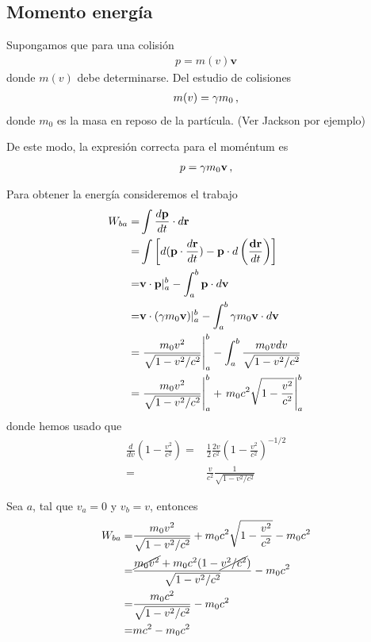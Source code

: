 \begin{frame}
\section{Momento energía}
Supongamos que para una colisión
\begin{align*}
  p=m(v)\mathbf{v}
\end{align*}
donde $m(v)$ debe determinarse. Del estudio de colisiones
\begin{align*}
  m(v)=\gamma m_0\,,
\end{align*}
donde $m_0$ es la masa en reposo de la partícula. (Ver Jackson por ejemplo)

De este modo, la expresión correcta para el moméntum es
\begin{align}
  \label{eq:gmv}
  p=\gamma m_0 \mathbf{v}\,,  
\end{align}


Para obtener la energía consideremos el trabajo
\begin{align*}
  W_{ba}=&\int\frac{d\mathbf{p}}{dt}\cdot d\mathbf{r}\nonumber\\
  =&\int\left[d(\mathbf{p}\cdot\frac{d\mathbf{r}}{dt})-\mathbf{p}\cdot d\left(\frac{\mathbf{dr}}{dt}  \right)\right]\nonumber\\
=&\mathbf{v}\cdot \mathbf{p}|_a^b-\int_a^b\mathbf{p}\cdot d\mathbf{v}\nonumber\\
=&\mathbf{v}\cdot (\gamma m_0\mathbf{v})|_a^b-\int_a^b\gamma m_0\mathbf{v}\cdot d\mathbf{v}\nonumber\\
=&\left.\frac{m_0 v^2}{\sqrt{1-{v^2}/{c^2}}}\right|_a^b-\int_a^b\frac{m_0v dv}{\sqrt{1-v^2/c^2}}\nonumber\\
=&\left.\frac{m_0 v^2}{\sqrt{1-{v^2}/{c^2}}}\right|_a^b+\left.m_0 c^2\sqrt{1-\frac{v^2}{c^2}}\right|_a^b
\end{align*}
donde hemos usado que
\begin{align*}
  \frac{d}{dv}
  \left(
    1-\frac{v^2}{c^2}
  \right)=&\frac{1}{2}\frac{2v}{c^2}
  \left(1-\frac{v^2}{c^2}\right)^{-1/2}\nonumber\\
  =&\frac{v}{c^2}\frac{1}{\sqrt{1-{v^2}/{c^2}}}
\end{align*}

Sea $a$, tal que $v_a=0$ y $v_b=v$, entonces
\begin{align*}
  W_{ba}=&\frac{m_0 v^2}{\sqrt{1-v^2/c^2}}+m_0 c^2\sqrt{1-\frac{v^2}{c^2}}-m_0 c^2\nonumber\\
=&\frac{\cancel{m_0 v^2}+m_0c^2(1-\cancel{v^2/c^2})}{\sqrt{1-v^2/c^2}}-m_0 c^2\nonumber\\
=&\frac{m_0c^2}{\sqrt{1-v^2/c^2}}-m_0 c^2\nonumber\\
  =&mc^2-m_0 c^2
\end{align*}


\end{frame}
